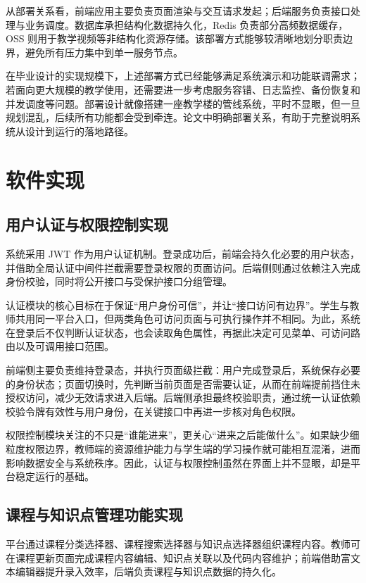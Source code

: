 从部署关系看，前端应用主要负责页面渲染与交互请求发起；后端服务负责接口处理与业务调度。数据库承担结构化数据持久化，Redis 负责部分高频数据缓存，OSS 则用于教学视频等非结构化资源存储。该部署方式能够较清晰地划分职责边界，避免所有压力集中到单一服务节点。

在毕业设计的实现规模下，上述部署方式已经能够满足系统演示和功能联调需求；若面向更大规模的教学使用，还需要进一步考虑服务容错、日志监控、备份恢复和并发调度等问题。部署设计就像搭建一座教学楼的管线系统，平时不显眼，但一旦规划混乱，后续所有功能都会受到牵连。论文中明确部署关系，有助于完整说明系统从设计到运行的落地路径。


\chapter{软件实现}

\section{用户认证与权限控制实现}
系统采用 JWT 作为用户认证机制。登录成功后，前端会持久化必要的用户状态，并借助全局认证中间件拦截需要登录权限的页面访问。后端侧则通过依赖注入完成身份校验，同时将公开接口与受保护接口分组管理。

认证模块的核心目标在于保证“用户身份可信”，并让“接口访问有边界”。学生与教师共用同一平台入口，但两类角色可访问页面与可执行操作并不相同。为此，系统在登录后不仅判断认证状态，也会读取角色属性，再据此决定可见菜单、可访问路由以及可调用接口范围。

前端侧主要负责维持登录态，并执行页面级拦截：用户完成登录后，系统保存必要的身份状态；页面切换时，先判断当前页面是否需要认证，从而在前端提前挡住未授权访问，减少无效请求进入后端。后端侧承担最终校验职责，通过统一认证依赖校验令牌有效性与用户身份，在关键接口中再进一步核对角色权限。

权限控制模块关注的不只是“谁能进来”，更关心“进来之后能做什么”。如果缺少细粒度权限边界，教师端的资源维护能力与学生端的学习操作就可能相互混淆，进而影响数据安全与系统秩序。因此，认证与权限控制虽然在界面上并不显眼，却是平台稳定运行的基础。

\section{课程与知识点管理功能实现}
平台通过课程分类选择器、课程搜索选择器与知识点选择器组织课程内容。教师可在课程更新页面完成课程内容编辑、知识点关联以及代码内容维护；前端借助富文本编辑器提升录入效率，后端负责课程与知识点数据的持久化。

